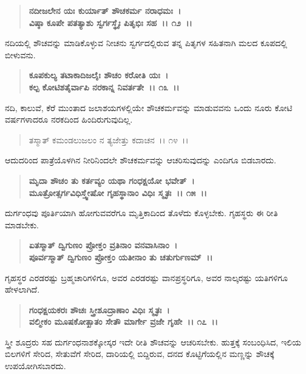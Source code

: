 \begin{verse}
\textbf{ನದೀಜಲೇನ ಯಃ ಕುರ್ಯಾತ್ ಶೌಚಕರ್ಮ ನರಾಧಮಃ~।}\\\textbf{ವಿಷ್ಠಾ ಕೂಪೇ ಪತತ್ಯಾಶು ಸ್ವರ್ಗಸ್ಥೈಃ ಪಿತೃಭಿಃ ಸಹ~।। ೧೨~।।}
\end{verse}

ನದಿಯಲ್ಲಿ ಶೌಚವನ್ನು ಮಾಡಿಕೊಳ್ಳುವ ನೀಚನು ಸ್ವರ್ಗದಲ್ಲಿರುವ ತನ್ನ ಪಿತೃಗಳ ಸಹಿತನಾಗಿ ಮಲದ ಕೂಪದಲ್ಲಿ ಬೀಳುವನು.

\begin{verse}
\textbf{ಕೂಪಕುಲ್ಯ ತಟಾಕಾದಿಜಲೈಃ ಶೌಚಂ ಕರೋತಿ ಯಃ~।}\\\textbf{ಕಲ್ಪ ಕೋಟಿಶತೈರ್ವಾಪಿ ನರಕಾನ್ನ ನಿವರ್ತತೇ~।। ೧೩~।।}
\end{verse}

ನದಿ, ಕಾಲುವೆ, ಕೆರೆ ಮುಂತಾದ ಜಲಾಶಯಗಳಲ್ಲಿಯೇ ಶೌಚಕರ್ಮವನ್ನು ಮಾಡುವವನು ಒಂದು ನೂರು ಕೋಟಿ ವರ್ಷಗಳಾದರೂ ನರಕದಿಂದ ಹಿಂದಿರುಗುವುದಿಲ್ಲ.

\begin{verse}
ತಸ್ಮಾತ್ ಕಮಂಡಲುಜಲಂ ನ ತ್ಯಜೇತ್ತು ಕದಾಚನ~।। ೧೪~।।
\end{verse}

ಆದುದರಿಂದ ಪಾತ್ರೆಯೊಳಗಿನ ನೀರಿನಿಂದಲೇ ಶೌಚಕರ್ಮವನ್ನು ಆಚರಿಸುವುದನ್ನು ಎಂದಿಗೂ ಬಿಡಬಾರದು.

\begin{verse}
\textbf{ಮೃದಾ ಶೌಚಂ ತು ಕರ್ತವ್ಯಂ ಯಥಾ ಗಂಧಕ್ಷಯೋ ಭವೇತ್~।}\\\textbf{ಮೂತ್ರೋತ್ಸರ್ಗವಿಧಿಸ್ತ್ವೇಷೋ ಗೃಹಸ್ಥಾನಾಂ ವಿಧಿಃ ಸ್ಮೃತಃ~।। ೧೫~।।}
\end{verse}

ದುರ್ಗಂಧವು ಪೂರ್ತಿಯಾಗಿ ಹೋಗುವವರೆಗೂ ಮೃತ್ತಿಕಾದಿಂದ ತೊಳೆದು ಕೊಳ್ಳಬೇಕು. ಗೃಹಸ್ಥರು ಈ ರೀತಿ ಮಾಡಬೇಕು.

\begin{verse}
\textbf{ಏತಸ್ಮಾತ್ ದ್ವಿಗುಣಂ ಪ್ರೋಕ್ತಂ ವ್ರತಿನಾಂ ವನವಾಸಿನಾಂ~।}\\\textbf{ಪೂರ್ವಸ್ಮಾತ್ ದ್ವಿಗುಣಂ ಪ್ರೋಕ್ತಂ ಯತೀನಾಂ ತು ಚತುರ್ಗುಣಮ್~।।}
\end{verse}

ಗೃಹಸ್ಥರ ಎರಡರಷ್ಟು ಬ್ರಹ್ಮಚಾರಿಗಳಿಗೂ, ಅವರ ಎರಡರಷ್ಟು ವಾನಪ್ರಸ್ಥರಿಗೂ, ಅವರ ನಾಲ್ಕರಷ್ಟು ಯತಿಗಳಿಗೂ ಹೇಳಲಾಗಿದೆ.

\begin{verse}
\textbf{ಗಂಧಕ್ಷಯಕರಃ ಶೌಚಃ ಸ್ತ್ರೀಶೂದ್ರಾಣಾಂ ವಿಧಿಃ ಸ್ಮೃತಃ~।}\\\textbf{ವಲ್ಮೀಕಂ ಮೂಷಕೋತ್ಖಾತಂ ಸೇತೌ ಮಾರ್ಗೇ ವ್ರಜೇ ಗೃಹೇ~।। ೧೭~।।}
\end{verse}

ಸ್ತ್ರೀ ಶೂದ್ರರು ಸಹ ದುರ್ಗಂಧನಾಶಕ್ಕೋಸ್ಕರ ಇದೇ ರೀತಿ ಶೌಚವನ್ನು ಆಚರಿಸಬೇಕು. ಹುತ್ತಕ್ಕೆ ಸಂಬಂಧಿಸಿದ, ಇಲಿಯ ಬಿಲಗಳಿಗೆ ಸೇರಿದ, ಸೇತುವೆಗೆ ಸೇರಿದ, ದಾರಿಯಲ್ಲಿ ಬಿದ್ದಿರುವ, ದನದ ಕೊಟ್ಟಿಗೆಯಲ್ಲಿನ ಮಣ್ಣನ್ನು ಶೌಚಕ್ಕೆ ಉಪಯೋಗಿಸಬಾರದು.

